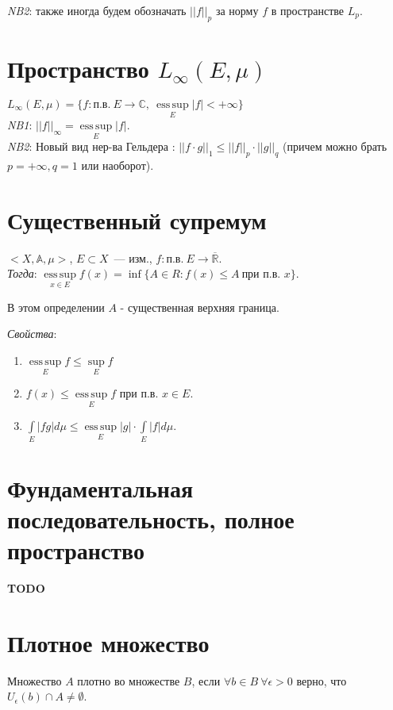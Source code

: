 \documentclass[paper=a4, fontsize=17pt]{article}
\DeclareMathOperator*{\esssup}{ess\, sup}
\begin{document}
	\emph{NB2}: также иногда будем обозначать $||f||_p$ за норму $f$ в пространстве $L_p$.

	\section{Пространство $L_{\infty}(E,\mu)$}
	$L_\infty(E, \mu) =\{f : \text{п.в.}\ E \rightarrow \mathbb{C},\ \esssup\limits_E |f| < +\infty \}$\\
	\emph{NB1}: $||f||_\infty = \esssup\limits_E |f|$.\\

	\emph{NB2}: Новый вид нер-ва Гельдера : $||f \cdot g||_1 \leq ||f||_p \cdot ||g||_q$ (причем можно брать $p = +\infty, q = 1$ или наоборот).

	\section{Существенный супремум}
	$<X, \mathds{A}, \mu>$, $E \subset X$~--- изм., $f : \text{п.в.}\ E \rightarrow \overline{\mathbb{R}}$.\\

	\emph{Тогда}: $\esssup\limits_{x \in E} f(x) = \inf \{A \in R : f(x) \leq A\ \text{при п.в. $x$}\}$.

	В этом определении $A$ - существенная верхняя граница.

	\emph{Свойства}:
	\begin{enumerate}
		\item
		$\esssup\limits_E f \leq \sup\limits_E f$

		\item
		$f(x) \leq \esssup\limits_E f$ при п.в. $x \in E$.

		\item
		$\int\limits_E |fg|d\mu \leq \esssup\limits_E |g| \cdot \int\limits_E |f|d\mu$.
	\end{enumerate}

	\section{Фундаментальная последовательность, полное пространство}
	{\color{red} \textbf{TODO}}

	\section{Плотное множество}
	Множество $A$ плотно во множестве $B$, если $\forall b \in B \ \forall \epsilon > 0$ верно, что $U_\epsilon(b) \cap A \neq \emptyset$.
\end{document}
